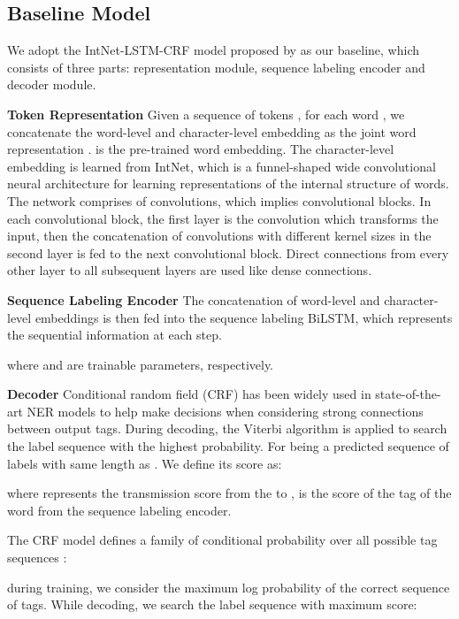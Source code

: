 \documentclass[letterpaper]{article} \usepackage{aaai20}  \usepackage{times}  \usepackage{helvet} \usepackage{courier}  \usepackage[hyphens]{url}  \usepackage{graphicx} \urlstyle{rm} \def\UrlFont{\rm}  \usepackage{graphicx}  \frenchspacing  \setlength{\pdfpagewidth}{8.5in}  \setlength{\pdfpageheight}{11in}
\begin{document}
\subsection{Baseline Model}
We adopt the IntNet-LSTM-CRF model proposed by \cite{xin2018learning} as our baseline, which consists of three parts: representation module, sequence labeling encoder and decoder module.

\noindent\textbf{Token Representation}
Given a sequence of  tokens , for each word , we concatenate the word-level and character-level embedding as the joint word representation .  is the pre-trained word embedding. The character-level embedding  is learned from IntNet, which
is a funnel-shaped wide convolutional neural architecture for learning representations of the internal structure of words. The network comprises of  convolutions,  which implies  convolutional blocks. In each convolutional block, the first layer is the  convolution which transforms the input, then the concatenation of convolutions with different kernel sizes in the second layer is fed to the next convolutional block. Direct connections from every other layer to all subsequent layers are used like dense connections. 

\noindent\textbf{Sequence Labeling Encoder}
The concatenation of word-level and character-level embeddings   is then fed into the sequence labeling BiLSTM, which represents the sequential information at each step.


where  and  are trainable parameters, respectively. 

\noindent\textbf{Decoder}
Conditional random field (CRF) \cite{Lafferty:01} has been widely used in state-of-the-art NER models \cite{lample2016neural,ma2016end} to help make decisions when considering strong connections between output tags.
During decoding, the Viterbi algorithm is applied to search the label sequence with the highest probability.
For  being a predicted sequence of labels with same length as . We define its score as:

where  represents the transmission score  from the  to ,
  is the score of the  tag of the  word from the sequence labeling encoder.

The CRF model defines a family of conditional probability  over all possible tag sequences :

during training, we consider the maximum log probability
of the correct sequence of tags. 
While decoding, we search the label sequence with maximum score:
\end{document}
